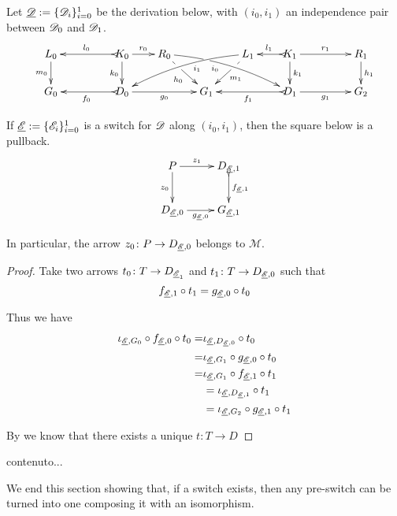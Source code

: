 \begin{proposition}\label{prop:pb}
	Let $\underline{\mathscr{D}}:=\{\mathscr{D}_{i}\}_{i=0}^1$ be the derivation below, with $(i_0, i_1)$ an independence pair between $\mathscr{D}_0$  and $\mathscr{D}_1$.
	\[\xymatrix@R=20pt@C=20pt{L_0 \ar[d]_{m_0}&& K_0
		\ar[d]_{k_0}\ar@{>->}[ll]_{l_0} \ar[r]^{r_0} & R_0
		\ar@{>}@/^.25cm/[drrr]|(.32)\hole_(.4){i_0}
		\ar[dr]|(.33)\hole_{h_0} && L_1 \ar@{>}@/_.25cm/[dlll]^(.4){i_1}
		\ar[dl]|(.33)\hole^{m_1}& K_1 \ar[d]^{k_1}\ar@{>->}[l]_{l_1}
		\ar[rr]^{r_1} && R_1 \ar[d]^{h_1}\\G_0 && \ar@{>->}[ll]^{f_0}
		D_0 \ar[rr]_{g_0}&& G_1 && \ar@{>->}[ll]^{f_1} D_1
		\ar[rr]_{g_1}&& G_2}
	\]
	
	If $\underline{\mathscr{E}}:=\{\mathscr{E}_{i}\}_{i=0}^1$ is a switch for $\mathscr{D}$ along $(i_0, i_1)$, then the square below is a pullback.
	\[\xymatrix{P  \ar[r]^-{z_1} \ar[d]_{z_0}& D_{\der{E}, 1} \ar@{>->}[d]^{f_{\der{E},1}} \\ D_{\der{E},0} \ar[r]_{g_{\der{E},0}}& G_{\der{E},1}}\]
	
	In particular, the arrow $z_0\colon P\to D_{\underline{\mathscr{E}},0}$ belongs to $\mathcal{M}$.
\end{proposition}
\begin{proof}
	Take two arrows $t_0\colon T\to D_{\underline{\mathscr{E}}_1}$ and $t_1\colon T\to D_{\underline{\mathscr{E}},0}$ such that \[f_{\underline{\mathscr{E}},1}\circ t_1=g_{\underline{\mathscr{E}},0}\circ t_0\] 
	
	Thus we have
	\begin{align*}
		\iota_{\underline{\mathscr{E}}, G_0}\circ f_{\underline{\mathscr{E}},0}\circ t_0=&\iota_{\underline{\mathscr{E}}, D_{\underline{\mathscr{E}},0}}\circ t_0\\=&\iota_{\underline{\mathscr{E}}, G_1}\circ g_{\underline{\mathscr{E}},0}\circ t_0\\=&\iota_{\underline{\mathscr{E}}, G_1}\circ f_{\underline{\mathscr{E}},1}\circ t_1\\&= \iota_{\underline{\mathscr{E}}, D_{\underline{\mathscr{E}},1}}\circ t_1\\&=\iota_{\underline{\mathscr{E}}, G_2}\circ g_{\underline{\mathscr{E}},1} \circ t_1
	\end{align*}
	
	By  we know that there exists a unique $t\colon T\to D_{}$
\end{proof}

\begin{corollary}
	contenuto...
\end{corollary}

\fi 

We end this section showing that, if a switch exists, then any pre-switch can be turned into one composing it with an isomorphism.

